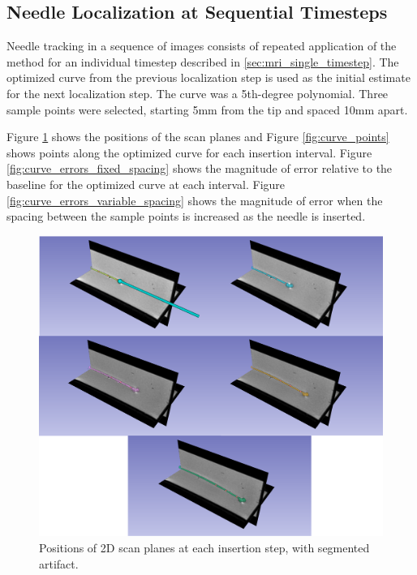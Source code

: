 \subsection{Needle Localization at Sequential Timesteps}
Needle tracking in a sequence of images consists of repeated application of the method for an individual timestep described in \ref{sec:mri_single_timestep}. The optimized curve from the previous localization step is used as the initial estimate for the next localization step. The curve was a 5th-degree polynomial. Three sample points were selected, starting 5mm from the tip and spaced 10mm apart.

Figure \ref{fig:scan_slices} shows the positions of the scan planes and Figure \ref{fig:curve_points} shows points along the optimized curve for each insertion interval. Figure \ref{fig:curve_errors_fixed_spacing} shows the magnitude of error relative to the baseline for the optimized curve at each interval. Figure \ref{fig:curve_errors_variable_spacing} shows the magnitude of error when the spacing between the sample points is increased as the needle is inserted.

\begin{figure}[h]
\includegraphics[width=1.0\textwidth]{Fig/chap5/scan_slices.png}
\caption{Positions of 2D scan planes at each insertion step, with segmented artifact.}
\label{fig:scan_slices}
\end{figure}

